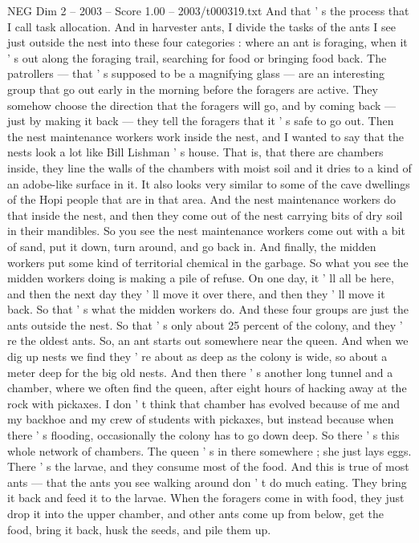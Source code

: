 \begin{textsample}{NEG Dim 2 – 2003 – Score 1.00 – 2003/t000319.txt}
And that ' s the process that I call task allocation.
And in harvester ants, I divide the tasks of the ants I see just outside the nest into these four categories : where an ant is foraging, when it ' s out along the foraging trail, searching for food or bringing food back.
The patrollers — that ' s supposed to be a magnifying glass — are an interesting group that go out early in the morning before the foragers are active.
They somehow choose the direction that the foragers will go, and by coming back — just by making it back — they tell the foragers that it ' s safe to go out.
Then the nest maintenance workers work inside the nest, and I wanted to say that the nests look a lot like Bill Lishman ' s house.
That is, that there are chambers inside, they line the walls of the chambers with moist soil and it dries to a kind of an adobe-like surface in it.
It also looks very similar to some of the cave dwellings of the Hopi people that are in that area.
And the nest maintenance workers do that inside the nest, and then they come out of the nest carrying bits of dry soil in their mandibles.
So you see the nest maintenance workers come out with a bit of sand, put it down, turn around, and go back in.
And finally, the midden workers put some kind of territorial chemical in the garbage.
So what you see the midden workers doing is making a pile of refuse.
On one day, it ' ll all be here, and then the next day they ' ll move it over there, and then they ' ll move it back.
So that ' s what the midden workers do.
And these four groups are just the ants outside the nest.
So that ' s only about 25 percent of the colony, and they ' re the oldest ants.
So, an ant starts out somewhere near the queen.
And when we dig up nests we find they ' re about as deep as the colony is wide, so about a meter deep for the big old nests.
And then there ' s another long tunnel and a chamber, where we often find the queen, after eight hours of hacking away at the rock with pickaxes.
I don ' t think that chamber has evolved because of me and my backhoe and my crew of students with pickaxes, but instead because when there ' s flooding, occasionally the colony has to go down deep.
So there ' s this whole network of chambers.
The queen ' s in there somewhere ; she just lays eggs.
There ' s the larvae, and they consume most of the food.
And this is true of most ants — that the ants you see walking around don ' t do much eating.
They bring it back and feed it to the larvae.
When the foragers come in with food, they just drop it into the upper chamber, and other ants come up from below, get the food, bring it back, husk the seeds, and pile them up.

\end{textsample}
